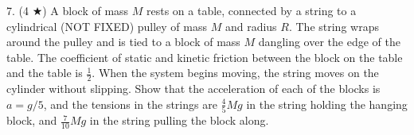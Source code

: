 7. (4 $\bigstar$) A block of mass $M$ rests on a table, connected by a string to a cylindrical (NOT FIXED) pulley of mass $M$ and radius $R$. The string wraps around the pulley and is tied to a block of mass $M$ dangling over the edge of the table. The coefficient of static and kinetic friction between the block on the table and the table is $\frac{1}{2}$. When the system begins moving, the string moves on the cylinder without slipping. Show that the acceleration of each of the blocks is $a = g/5$, and the tensions in the strings are $\frac{4}{5}Mg$ in the string holding the hanging block, and $\frac{7}{10}Mg$ in the string pulling the block along. 
\pagebreak